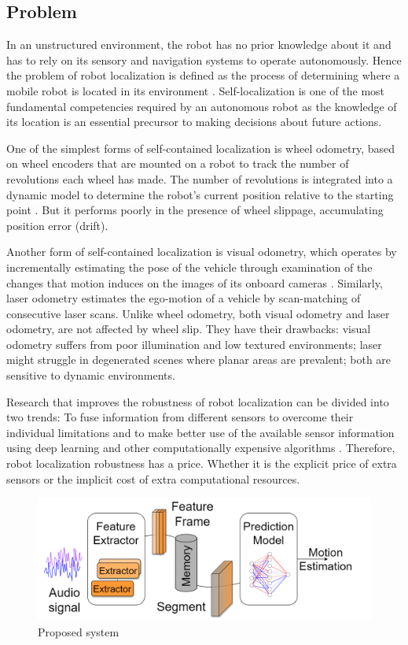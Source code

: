 \subsection{Problem} \label{subsec:problem}

In an unstructured environment, the robot has no prior knowledge about it and
has to rely on its sensory and navigation systems to operate autonomously.
Hence the problem of robot localization is defined as the process of
determining where a mobile robot is located in its environment
\cite{Localization2016}. Self-localization is one of the most fundamental
competencies required by an autonomous robot as the knowledge of its location
is an essential precursor to making decisions about future actions.

One of the simplest forms of self-contained localization is wheel odometry,
based on wheel encoders that are mounted on a robot to track the number of
revolutions each wheel has made. The number of revolutions is integrated into a
dynamic model to determine the robot's current position relative to the
starting point \cite{OdometrySurvey}. But it performs poorly in the presence of
wheel slippage, accumulating position error (drift).

Another form of self-contained localization is visual odometry, which operates
by incrementally estimating the pose of the vehicle through examination of the
changes that motion induces on the images of its onboard cameras
\cite{ScaramuzzaTutorial}. Similarly, laser odometry estimates the ego-motion
of a vehicle by scan-matching of consecutive laser scans. Unlike wheel
odometry, both visual odometry and laser odometry, are not affected by wheel
slip. They have their drawbacks: visual odometry suffers from poor illumination
and low textured environments; laser might struggle in degenerated scenes where
planar areas are prevalent; both are sensitive to dynamic environments.

Research that improves the robustness of robot localization can be divided into
two trends: To fuse information from different sensors to overcome their
individual limitations \cite{Valente2019,Vargas2021,Ojeda2006} and to make
better use of the available sensor information using deep learning and other
computationally expensive algorithms \cite{Long2021,DFVO}. Therefore, robot
localization robustness has a price. Whether it is the explicit price of extra
sensors or the implicit cost of extra computational resources.

\begin{figure}[t]
    \centering
    \includegraphics[width=\linewidth]{content/system.drawio.png}
    \caption{Proposed system}
    \label{fig:system}
\end{figure}

